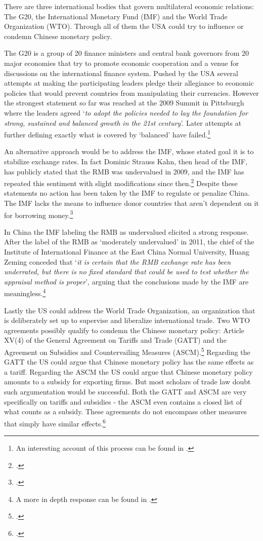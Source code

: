 There are three international bodies that govern multilateral economic relations: The 
G20, the International Monetary Fund (IMF) and the World Trade 
Organization (WTO). Through all of them the USA could try to influence or condemn Chinese monetary policy.

The G20 is a group of 20 finance ministers and central bank governors 
from 20 major economies that try to promote economic cooperation and a 
venue for discussions on the international finance system. Pushed by the 
USA several attempts at making the participating leaders pledge their 
allegiance to economic policies that would prevent countries from 
manipulating their currencies. However the strongest statement so far 
was reached at the 2009 Summit in Pittsburgh where the leaders agreed 
`\textit{to adopt the policies needed to lay the foundation for strong, 
sustained and balanced growth in the 21st century}'. Later attempts at 
further defining exactly what is covered by `balanced' have 
failed.\footnote{An interesting account of this process can be found in 
\cite{Levy11}.}

An alternative approach would be to address the IMF, whose stated goal it
is to stabilize exchange rates. In fact Dominic Strauss Kahn, then head of the IMF, has 
publicly stated that the RMB was undervalued in 2009, and the IMF has 
repeated this sentiment with slight modifications since 
then.\footnote{\cite{reuters09}.}  Despite these statements no action has been taken 
by the IMF to regulate or penalize China. The IMF
lacks the means to influence donor countries that aren't dependent on it for 
borrowing money.\footnote{\cite{Levy2010}.}

In China the IMF labeling the RMB as undervalued elicited a strong 
response. After the label of the RMB as `moderately undervalued' in 
2011, the chief of the Institute of International Finance at the East 
China Normal University, Huang Zeming conceded that `\textit{it is 
certain that the RMB exchange rate has been underrated, but there is no 
fixed standard that could be used to test whether the appraisal method 
is proper}', arguing that the conclusions made by the IMF are 
meaningless.\footnote{A more in depth response can be found in 
\cite{ChinaDaily11}.}

Lastly the US could address the World Trade Organization, an organization that is deliberately set up to supervise 
and liberalize international trade. Two WTO agreements possibly qualify to condemn the Chinese monetary policy: Article XV(4) of the General Agreement on Tariffs and Trade (GATT) and the Agreement on Subsidies and Countervailing Measures (ASCM).\footnote{\cite[pp. 135]{Waibel2010}.} Regarding the GATT the US could argue that Chinese monetary policy has the same effects as a tariff. Regarding the ASCM the US could argue that Chinese monetary policy amounts to a subsidy for exporting firms. But most scholars of trade law doubt such argumentation would be successful. Both the GATT and ASCM are very specifically on tariffs and subsidies - the ASCM even contains a closed list of what counts as a subsidy. These agreements  do not encompass other measures that simply have similar effects.\footnote{\cite{Waibel2010}.}

